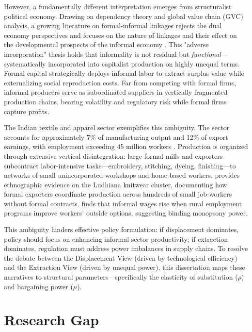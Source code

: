 However, a fundamentally different interpretation emerges from structuralist political economy. Drawing on dependency theory and global value chain (GVC) analysis, a growing literature on formal-informal linkages rejects the dual economy perspectives and focuses on the nature of linkages and their effect on the developmental prospects of the informal economy \autocite{sethuraman1992urban, Harriss1990, Portes1989, Sassen1996, Meagher2010}. This "adverse incorporation" thesis holds that informality is not residual but \textit{functional}—systematically incorporated into capitalist production on highly unequal terms. Formal capital strategically deploys informal labor to extract surplus value while externalizing social reproduction costs. Far from competing with formal firms, informal producers serve as subordinated suppliers in vertically fragmented production chains, bearing volatility and regulatory risk while formal firms capture profits.

The Indian textile and apparel sector exemplifies this ambiguity. The sector accounts for approximately 7\% of manufacturing output and 12\% of export earnings, with employment exceeding 45 million workers \autocite{MinistryTextiles2023}. Production is organized through extensive vertical disintegration: large formal mills and exporters subcontract labor-intensive tasks—embroidery, stitching, dyeing, finishing—to networks of small unincorporated workshops and home-based workers. \textcite{Tewari1999} provides ethnographic evidence on the Ludhiana knitwear cluster, documenting how formal exporters coordinate production across hundreds of small job-workers without formal contracts. \textcite{Soundararajan2019} finds that informal wages rise when rural employment programs improve workers' outside options, suggesting binding monopsony power.



This ambiguity hinders effective policy formulation: if displacement dominates, policy should focus on enhancing informal sector productivity; if extraction dominates, regulation must address power imbalances in supply chains. To resolve the debate between the Displacement View (driven by technological efficiency) and the Extraction View (driven by unequal power), this dissertation maps these narratives to structural parameters—specifically the elasticity of substitution ($\rho$) and bargaining power ($\mu$).


\section{Research Gap}


